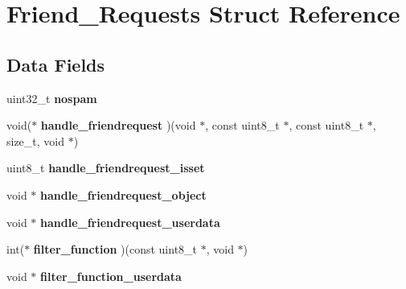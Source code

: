 \hypertarget{struct_friend___requests}{\section{Friend\+\_\+\+Requests Struct Reference}
\label{struct_friend___requests}
}
\subsection*{Data Fields}
\begin{DoxyCompactItemize}
\item 
\hypertarget{struct_friend___requests_a637ab08069536895c9a896c4ee9dcdf7}{uint32\+\_\+t {\bfseries nospam}}\label{struct_friend___requests_a637ab08069536895c9a896c4ee9dcdf7}

\item 
\hypertarget{struct_friend___requests_a9d869a78e35e2af8312a3bec21dc7d0c}{void($\ast$ {\bfseries handle\+\_\+friendrequest} )(void $\ast$, const uint8\+\_\+t $\ast$, const uint8\+\_\+t $\ast$, size\+\_\+t, void $\ast$)}\label{struct_friend___requests_a9d869a78e35e2af8312a3bec21dc7d0c}

\item 
\hypertarget{struct_friend___requests_aef7d18a109ced43f4cb3069083a91e69}{uint8\+\_\+t {\bfseries handle\+\_\+friendrequest\+\_\+isset}}\label{struct_friend___requests_aef7d18a109ced43f4cb3069083a91e69}

\item 
\hypertarget{struct_friend___requests_a21949251a7cb2ba8e6e3f973c8fdd01c}{void $\ast$ {\bfseries handle\+\_\+friendrequest\+\_\+object}}\label{struct_friend___requests_a21949251a7cb2ba8e6e3f973c8fdd01c}

\item 
\hypertarget{struct_friend___requests_a59dcbf63199ca147db439e5ade631a81}{void $\ast$ {\bfseries handle\+\_\+friendrequest\+\_\+userdata}}\label{struct_friend___requests_a59dcbf63199ca147db439e5ade631a81}

\item 
\hypertarget{struct_friend___requests_a09cd55683f2075e72518e94efbcba2d5}{int($\ast$ {\bfseries filter\+\_\+function} )(const uint8\+\_\+t $\ast$, void $\ast$)}\label{struct_friend___requests_a09cd55683f2075e72518e94efbcba2d5}

\item 
\hypertarget{struct_friend___requests_a52b17bf891c29cd0309d69ddf5be7e5e}{void $\ast$ {\bfseries filter\+\_\+function\+\_\+userdata}}\label{struct_friend___requests_a52b17bf891c29cd0309d69ddf5be7e5e}


\end{DoxyCompactItemize}
